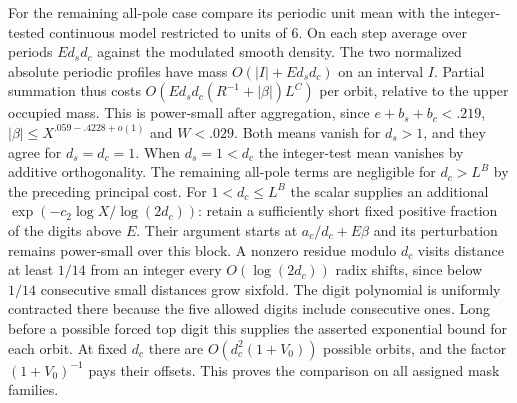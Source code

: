 \documentclass[11pt,a4paper]{article}
\theoremstyle{paperplain}
\numberwithin{equation}{section}
\begin{document}
For the remaining all-pole case compare its periodic unit mean
with the integer-tested continuous model restricted to units of $6$.
On each step average over periods $Ed_sd_c$ against the modulated
smooth density. The two normalized absolute periodic profiles have
mass $O(|I|+Ed_sd_c)$ on an interval $I$. Partial summation thus
costs $O(Ed_sd_c(R^{-1}+|\beta|)L^C)$ per orbit, relative to
the upper occupied mass. This is power-small after aggregation,
since $e+b_s+b_c<.219$, $|\beta|\le X^{.059-.4228+o(1)}$ and
$W<.029$. Both means vanish for $d_s>1$, and they agree for
$d_s=d_c=1$. When $d_s=1<d_c$ the integer-test mean vanishes by
additive orthogonality. The remaining all-pole terms are negligible
for $d_c>L^B$ by the preceding principal cost. For $1<d_c\le L^B$
the scalar supplies an additional
$\exp(-c_2\log X/\log(2d_c))$: retain a sufficiently short fixed
positive fraction of the digits above $E$. Their argument starts
at $a_c/d_c+E\beta$ and its perturbation remains power-small over
this block. A nonzero residue modulo $d_c$ visits distance at
least $1/14$ from an integer every $O(\log(2d_c))$ radix shifts,
since below $1/14$ consecutive small distances grow sixfold.
The digit polynomial is uniformly contracted there because the
five allowed digits include consecutive ones. Long before a
possible forced top digit this supplies the asserted exponential
bound for each orbit. At fixed $d_c$ there are
$O(d_c^2(1+V_0))$ possible orbits, and the factor
$(1+V_0)^{-1}$ pays their offsets. This proves the comparison
on all assigned mask families.
\end{document}
